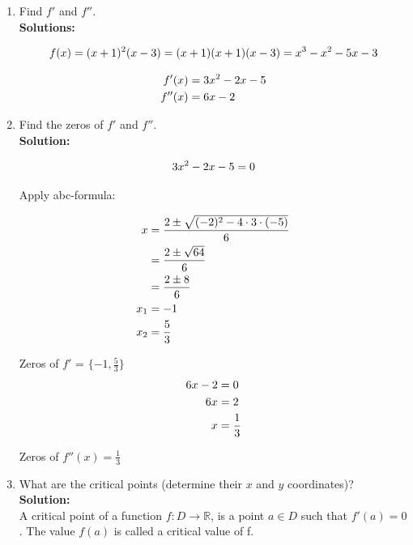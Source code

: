 \documentclass[a4paper]{article}
\begin{document}
\begin{enumerate}
\begin{enumerate}
	\item Find $f'$ and $f''$.\\
	\textbf{Solutions:}
	
\begin{align}
	f(x) = (x+1)^2(x-3) = (x+1)(x+1)(x-3) = x^3 - x^2 - 5x - 3\notag
\end{align}		
	
\begin{align}
	f'(x) &= 3x^2 - 2x - 5\notag\\
	f''(x) &= 6x - 2\notag
\end{align}	
\vspace{1em}	
	
	\item Find the zeros of $f'$ and $f''$.\\
	\textbf{Solution:}
	
\begin{align}
	3x^2 - 2x - 5 = 0\notag
\end{align}		
	
Apply abc-formula:

\begin{align}
	x &= \frac{2 \pm \sqrt{(-2)^2 - 4 \cdot 3 \cdot (-5)}}{6}\notag\\
	&= \frac{2 \pm \sqrt{64}}{6}\notag\\
	&= \frac{2 \pm 8}{6}\notag\\
	x_1 &= -1\notag\\ 
	x_2 &= \frac{5}{3}\notag
\end{align}	
	
Zeros of $f'$ = $\{-1,\frac{5}{3}\}$\\

\begin{align}
	6x - 2 &= 0\notag\\
	6x &= 2\notag\\
	x &= \frac{1}{3}\notag
\end{align}	
	
Zeros of $f''(x) = \frac{1}{3}$\\	
	
	\item What are the critical points (determine their $x$ and $y$ coordinates)?\\
	\textbf{Solution:}\\
	
A critical point of a function $f: D \rightarrow \mathbb{R}$, is a point $a \in D$ such that $f'(a) = 0$. The value $f(a)$ is called a critical value of f.\\



\end{enumerate}
\end{enumerate}
\end{document}
